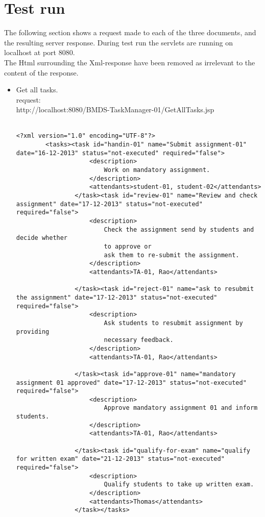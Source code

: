 	\section{Test run}
	\label{servlet_test}
	The following section shows a request made to each of the three documents, and the resulting server response. During test run the servlets are running on localhost at port 8080.\\
	The Html surrounding the Xml-response have been removed as irrelevant to the content of the response.\\
	\begin{itemize}
		\item
		Get all tasks.\\
		request:\\
		http://localhost:8080/BMDS-TaskManager-01/GetAllTasks.jsp\\\\
		
		\begin{lstlisting}[caption=response:]
		<?xml version="1.0" encoding="UTF-8"?>
		<tasks><task id="handin-01" name="Submit assignment-01" date="16-12-2013" status="not-executed" required="false">
					<description>
						Work on mandatory assignment.
					</description>
					<attendants>student-01, student-02</attendants>
				</task><task id="review-01" name="Review and check assignment" date="17-12-2013" status="not-executed" required="false">
					<description>
						Check the assignment send by students and decide whether
						to approve or
						ask them to re-submit the assignment.
					</description>
					<attendants>TA-01, Rao</attendants>
		
				</task><task id="reject-01" name="ask to resubmit the assignment" date="17-12-2013" status="not-executed" required="false">
					<description>
						Ask students to resubmit assignment by providing
						necessary feedback.
					</description>
					<attendants>TA-01, Rao</attendants>
		
				</task><task id="approve-01" name="mandatory assignment 01 approved" date="17-12-2013" status="not-executed" required="false">
					<description>
						Approve mandatory assignment 01 and inform students.
					</description>
					<attendants>TA-01, Rao</attendants>
		
				</task><task id="qualify-for-exam" name="qualify for written exam" date="21-12-2013" status="not-executed" required="false">
					<description>
						Qualify students to take up written exam.
					</description>
					<attendants>Thomas</attendants>
				</task></tasks>
		\end{lstlisting}
				\\\\
		

\end{itemize}
